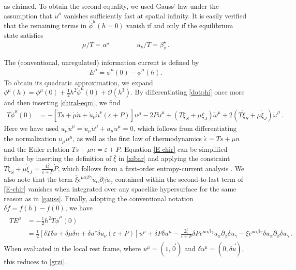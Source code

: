 \documentclass[a4paper, amsfonts, amssymb, amsmath, reprint, showkeys, nofootinbib, twoside,notitlepage,onecolumn,preprintnumbers]{revtex4-2}
\theoremstyle{definition}
\theoremstyle{theorem}
\theoremstyle{corollary}
\begin{document}
as claimed. To obtain the second equality, we used Gauss' law under the assumption that $\dot u^\mu$ vanishes sufficiently fast at spatial infinity. It is easily verified that the remaining terms in $\dot\phi^\mu(h=0)$ vanish if and only if the equilibrium state satisfies
\begin{align} \label{chiral-eqm}
	\mu/T = \alpha^\star \qquad \qquad u_\nu/T = \beta_\nu^\star\, .
\end{align}

The (conventional, unregulated) information current is defined by
\begin{align}
    E^\mu = \phi^\mu(0) - \phi^\mu(h).
\end{align}
To obtain its quadratic approximation, we expand $\phi^\mu(h) = \phi^\mu(0) + \frac{1}{2}h^2\ddot \phi^\mu(0) + \mathcal O(h^3)$. By differentiating \eqref{dotphi} once more and then inserting \eqref{chiral-eqm}, we find
\begin{align} \label{E-chir}
    T\ddot \phi^\mu(0) &= -[\dot T \dot s + \dot \mu \dot n + \dot u_\nu \dot u^\nu (\varepsilon + P)]u^\mu - 2\dot P\dot u^\mu + (T\xi_S + \mu\xi_J) \ddot \omega^\mu + 2 (T\dot \xi_S + \mu \dot\xi_J) \dot\omega^\mu\, .
\end{align}
Here we have used $u_\mu \dot u^\mu = \dot u_\mu \dot u^\mu + u_\mu \ddot u^\mu = 0$, which follows from differentiating the normalization $u_\mu u^\mu$, as well as the first law of thermodynamics $\dot \varepsilon = T \dot s + \mu \dot n$ and the Euler relation $Ts+\mu n = \varepsilon + P$. Equation \eqref{E-chir} can be simplified further by inserting the definition of $\bar\xi$ in \eqref{xibar} and applying the constraint $T \dot \xi_S + \mu \dot \xi_J = \frac{4\bar\xi}{\varepsilon + P}\dot P$, which follows from a first-order entropy-current analysis \cite{Son:2009tf, Stephanov:2015roa}. We also note that the term $\bar\xi\epsilon^{\mu\alpha\beta\gamma}u_\alpha \partial_\beta \ddot u_\gamma$ contained within the second-to-last term of \eqref{E-chir} vanishes when integrated over any spacelike hypersurface for the same reason as in \eqref{gauss}. Finally, adopting the conventional notation $\delta f = f(h) - f(0)$, we have
\begin{align}
    \begin{split}
        TE^\mu &= - \frac{1}{2}h^2 T\ddot \phi^\mu(0) \\
        &= \frac{1}{2}[\delta T \delta s + \delta \mu \delta n + \delta u^\nu \delta u_\nu(\varepsilon+ P)] u^\mu + \delta P \delta u^\mu - \frac{2\bar\xi}{\varepsilon + P}\delta P \epsilon^{\mu\alpha\beta\gamma} u_\alpha \partial_\beta \delta u_\gamma - \bar\xi \epsilon^{\mu\alpha\beta\gamma}\delta u_\alpha \partial_\beta \delta u_\gamma\, .
    \end{split}
\end{align}
When evaluated in the local rest frame, where $u^\mu = (1, \vec 0)$ and $\delta u^\mu = (0, \vec{\delta u})$, this reduces to \eqref{grzi}.








\label{lastpage}
\end{document}
